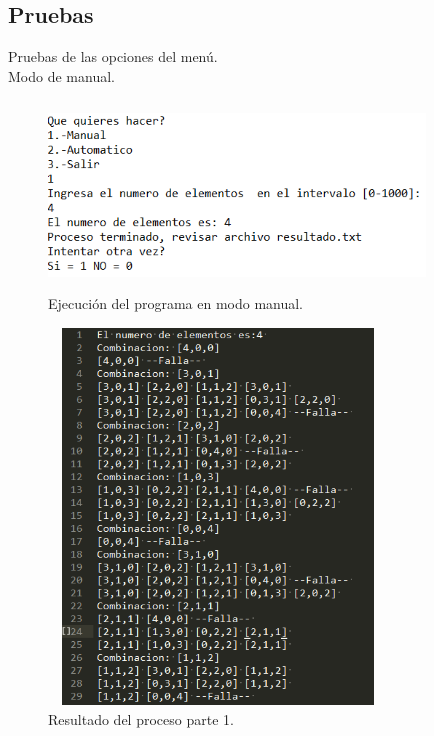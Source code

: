 	\subsection{Pruebas}
	Pruebas de las opciones del menú.
	\\
	{\large Modo de manual.}
	\begin{figure}[H]
		\begin{center}
			\includegraphics[width=10cm, height=5cm]{img/marcianos-manual-consola.png}
			\caption{Ejecución del programa en modo manual.}
			\label{fig:marcianos1}
		\end{center}
	\end{figure}
	\begin{figure}[H]
		\begin{center}
			\includegraphics[width=9cm, height=10cm]{img/marcianos-manual-archivo1.png}
			\caption{Resultado del proceso parte 1.}
			\label{fig:marcianos2a}
		\end{center}
	\end{figure}
